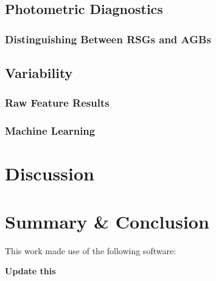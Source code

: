 \documentclass[twocolumn]{aastex62}
\begin{document}
\subsection{Photometric Diagnostics}\label{subsec:photometry}

\subsubsection{Distinguishing Between RSGs and AGBs}

\subsection{Variability}\label{subsec:variability}

\subsubsection{Raw Feature Results}

\subsubsection{Machine Learning}

\section{Discussion}\label{sec:conclusion}

\section{Summary \& Conclusion}\label{sec:conclusion}



\acknowledgments


This work made use of the following software:

\vspace{5mm}

{\bf Update this}




\end{document}
